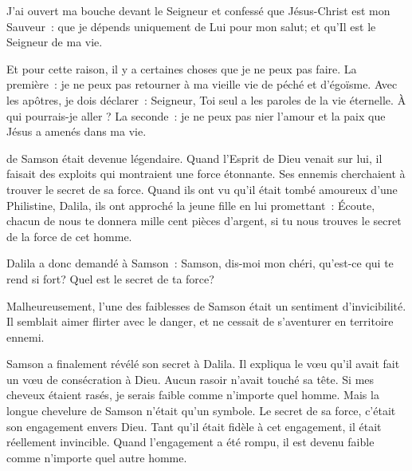 J'ai ouvert ma bouche devant le Seigneur et confessé que Jésus-Christ
 est mon Sauveur~: que je dépends uniquement de Lui pour mon salut;
 et qu'Il est le Seigneur de ma vie.

Et pour cette raison, il y a certaines choses que je ne peux pas faire.
 La première~: je ne peux pas retourner à ma vieille vie de péché et d'égoïsme.
 Avec les apôtres, je dois déclarer~:
 \og Seigneur, Toi seul a les paroles de la vie éternelle.
 \`A qui pourrais-je aller ? \fg{}
 La seconde~: je ne peux pas nier l'amour et la paix que Jésus
 a amenés dans ma vie. 

\dvrule






 de Samson était devenue légendaire.
 Quand l'Esprit de Dieu venait sur lui, il faisait des exploits
 qui montraient une force étonnante.
 Ses ennemis cherchaient à trouver le secret de sa force.
 Quand ils ont vu qu'il était tombé amoureux d'une Philistine, Dalila,
 ils ont approché la jeune fille en lui promettant~:
 \og Écoute, chacun de nous te donnera mille cent pièces d'argent,
 si tu nous trouves le secret de la force de cet homme. \fg{}

Dalila a donc demandé à Samson~:
 \og Samson, dis-moi mon chéri, qu'est-ce qui te rend si fort?
 Quel est le secret de ta force? \fg{}

Malheureusement, l'une des faiblesses de Samson était
 un sentiment d'invicibilité.
 Il semblait aimer flirter avec le danger,
 et ne cessait de s'aventurer en territoire ennemi.

Samson a finalement révélé son secret à Dalila.
 Il expliqua le vœu qu'il avait fait
 \ocadr un vœu de consécration à Dieu.
 Aucun rasoir n'avait touché sa tête.
 \og Si mes cheveux étaient rasés,
 je serais faible comme n'importe quel homme. \fg{}
 Mais la longue chevelure de Samson n'était qu'un symbole.
 Le secret de sa force, c'était son engagement envers Dieu.
 Tant qu'il était fidèle à cet engagement, il était réellement invincible.
 Quand l'engagement a été rompu, il est devenu faible
 comme n'importe quel autre homme.

